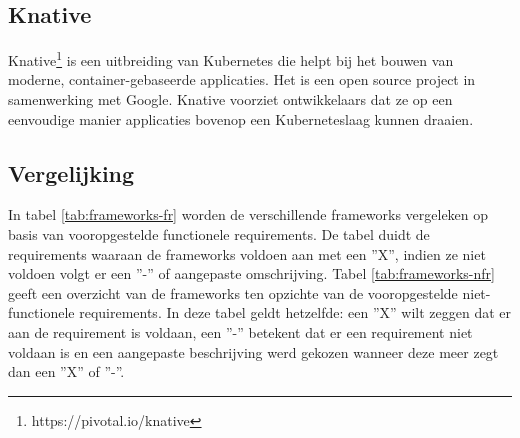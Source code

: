 \subsection{Knative}
Knative\footnote{https://pivotal.io/knative} is een uitbreiding van Kubernetes die helpt bij het bouwen van moderne, container-gebaseerde applicaties. Het is een open source project in samenwerking met Google. Knative voorziet ontwikkelaars dat ze op een eenvoudige manier applicaties bovenop een Kuberneteslaag kunnen draaien.

\subsection{Vergelijking}
In tabel \ref{tab:frameworks-fr} worden de verschillende frameworks vergeleken op basis van vooropgestelde functionele requirements.  De tabel duidt de requirements waaraan de frameworks voldoen aan met een ''X'', indien ze niet voldoen volgt er een ''-'' of aangepaste omschrijving. Tabel \ref{tab:frameworks-nfr} geeft een overzicht van de frameworks ten opzichte van de vooropgestelde niet-functionele requirements. In deze tabel geldt hetzelfde: een ''X'' wilt zeggen dat er aan de requirement is voldaan, een ''-'' betekent dat er een requirement niet voldaan is en een aangepaste beschrijving werd gekozen wanneer deze meer zegt dan een ''X'' of ''-''.


\begin{table}[]
    \centering
    \caption{Vergelijking open source serverless frameworks op basis van functionele requirements}
    \label{tab:frameworks-fr}
\end{table}


